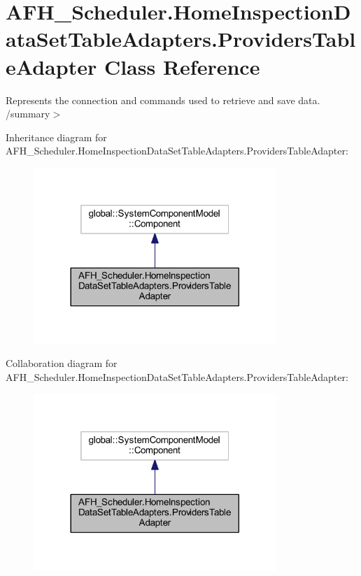 \section{A\+F\+H\+\_\+\+Scheduler.\+Home\+Inspection\+Data\+Set\+Table\+Adapters.\+Providers\+Table\+Adapter Class Reference}
\label{class_a_f_h___scheduler_1_1_home_inspection_data_set_table_adapters_1_1_providers_table_adapter}


Represents the connection and commands used to retrieve and save data. /summary$>$  




Inheritance diagram for A\+F\+H\+\_\+\+Scheduler.\+Home\+Inspection\+Data\+Set\+Table\+Adapters.\+Providers\+Table\+Adapter\+:
\nopagebreak
\begin{figure}[H]
\begin{center}
\leavevmode
\includegraphics[width=260pt]{class_a_f_h___scheduler_1_1_home_inspection_data_set_table_adapters_1_1_providers_table_adapter__inherit__graph}
\end{center}
\end{figure}


Collaboration diagram for A\+F\+H\+\_\+\+Scheduler.\+Home\+Inspection\+Data\+Set\+Table\+Adapters.\+Providers\+Table\+Adapter\+:
\nopagebreak
\begin{figure}[H]
\begin{center}
\leavevmode
\includegraphics[width=260pt]{class_a_f_h___scheduler_1_1_home_inspection_data_set_table_adapters_1_1_providers_table_adapter__coll__graph}
\end{center}
\end{figure}
